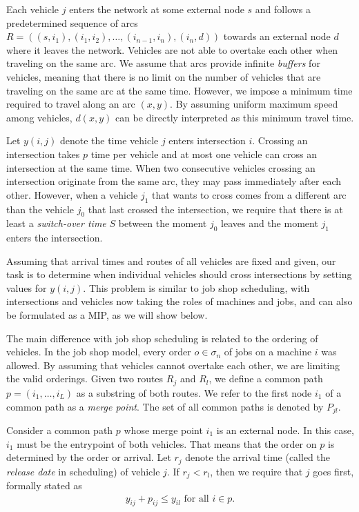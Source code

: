 \documentclass{article}
\theoremstyle{definition}
\theoremstyle{plain}
\begin{document}
Each vehicle $j$ enters the network at some external node $s$ and follows a
predetermined sequence of arcs
$R = ((s,i_{1}), (i_{1},i_{2}), \dots, (i_{n-1},i_{n}), (i_{n},d))$ towards an
external node $d$ where it leaves the network. Vehicles are not able to overtake
each other when traveling on the same arc. We assume that arcs provide
infinite \textit{buffers} for vehicles, meaning that there is no limit on the
number of vehicles that are traveling on the same arc at the same time.
However, we impose a minimum time required to travel along an arc $(x,y)$. By
assuming uniform maximum speed among vehicles, $d(x,y)$ can be directly
interpreted as this minimum travel time.

Let $y(i,j)$ denote the time vehicle $j$ enters intersection $i$. Crossing an
intersection takes $p$ time per vehicle and at most one vehicle can cross an
intersection at the same time. When two consecutive vehicles crossing an
intersection originate from the same arc, they may pass immediately after each
other. However, when a vehicle $j_{1}$ that wants to cross comes from a
different arc than the vehicle $j_{0}$ that last crossed the intersection, we
require that there is at least a \textit{switch-over time} $S$ between the
moment $j_{0}$ leaves and the moment $j_{1}$ enters the intersection.

Assuming that arrival times and routes of all vehicles are fixed and given, our
task is to determine when individual vehicles should cross intersections by
setting values for $y(i,j)$. This problem is similar to job shop scheduling,
with intersections and vehicles now taking the roles of machines and jobs, and
can also be formulated as a MIP, as we will show below.

The main difference with job shop scheduling is related to the ordering of
vehicles. In the job shop model, every order $o \in \sigma_{n}$ of jobs on a
machine $i$ was allowed. By assuming that vehicles cannot overtake each other,
we are limiting the valid orderings.
Given two routes $R_{j}$ and $R_{l}$, we define a common path
$p=(i_{1},\dots,i_{L})$ as a substring of both routes. We refer to the first
node $i_{1}$ of a common path as a \textit{merge point}. The set of all common
paths is denoted by $P_{jl}$.

Consider a common path $p$ whose merge point $i_{1}$ is an external node.
In this case, $i_{1}$ must be the entrypoint of both vehicles.
That means that the order on $p$ is determined by the order or arrival.
Let $r_{j}$ denote the arrival time (called the \textit{release date} in
scheduling) of vehicle $j$.
If $r_{j} < r_{l}$, then we require that $j$ goes first, formally stated as
\begin{align*}
  y_{ij} + p_{ij} \leq y_{il} \text{ for all } i \in p.
\end{align*}
\end{document}

